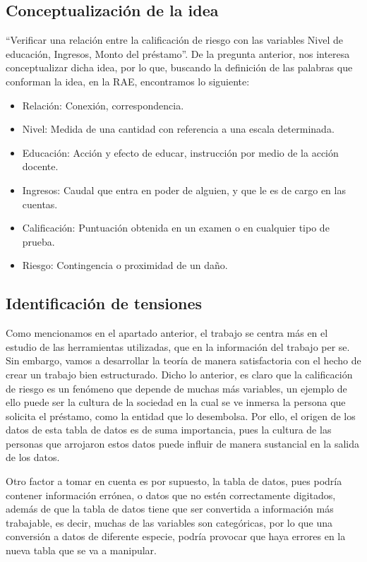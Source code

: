 \documentclass[
  letterpaper,
  DIV=11,
  numbers=noendperiod]{scrreprt}
\begin{document}
\subsection{Conceptualización de la
idea}\label{conceptualizaciuxf3n-de-la-idea}

``Verificar una relación entre la calificación de riesgo con las
variables Nivel de educación, Ingresos, Monto del préstamo''. De la
pregunta anterior, nos interesa conceptualizar dicha idea, por lo que,
buscando la definición de las palabras que conforman la idea, en la RAE,
encontramos lo siguiente:

\begin{itemize}
\item
  Relación: Conexión, correspondencia.
\item
  Nivel: Medida de una cantidad con referencia a una escala determinada.
\item
  Educación: Acción y efecto de educar, instrucción por medio de la
  acción docente.
\item
  Ingresos: Caudal que entra en poder de alguien, y que le es de cargo
  en las cuentas.
\item
  Calificación: Puntuación obtenida en un examen o en cualquier tipo de
  prueba.
\item
  Riesgo: Contingencia o proximidad de un daño.
\end{itemize}

\subsection{Identificación de
tensiones}\label{identificaciuxf3n-de-tensiones}

Como mencionamos en el apartado anterior, el trabajo se centra más en el
estudio de las herramientas utilizadas, que en la información del
trabajo per se. Sin embargo, vamos a desarrollar la teoría de manera
satisfactoria con el hecho de crear un trabajo bien estructurado. Dicho
lo anterior, es claro que la calificación de riesgo es un fenómeno que
depende de muchas más variables, un ejemplo de ello puede ser la cultura
de la sociedad en la cual se ve inmersa la persona que solicita el
préstamo, como la entidad que lo desembolsa. Por ello, el origen de los
datos de esta tabla de datos es de suma importancia, pues la cultura de
las personas que arrojaron estos datos puede influir de manera
sustancial en la salida de los datos.

Otro factor a tomar en cuenta es por supuesto, la tabla de datos, pues
podría contener información errónea, o datos que no estén correctamente
digitados, además de que la tabla de datos tiene que ser convertida a
información más trabajable, es decir, muchas de las variables son
categóricas, por lo que una conversión a datos de diferente especie,
podría provocar que haya errores en la nueva tabla que se va a
manipular.
\end{document}
